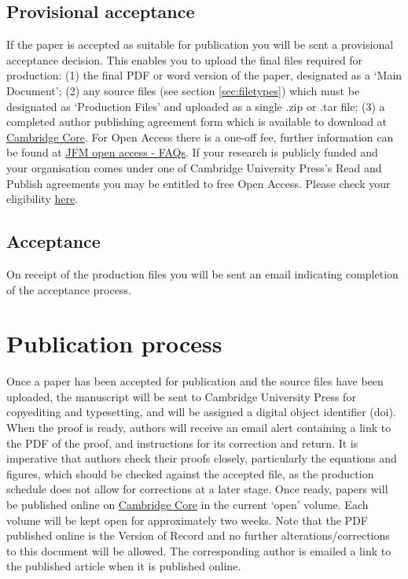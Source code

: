 \documentclass[lineno]{jfm}
\begin{document}
\subsection{Provisional acceptance}
 If the paper is accepted as suitable for publication you will be sent a provisional acceptance decision. This enables you to upload the final files required for production:
(1) the final PDF or word version of the paper, designated as a `Main Document';
(2) any source files (see section \ref{sec:filetypes}) which must be designated as `Production Files' and uploaded as a single .zip or .tar file;
(3) a completed author publishing agreement form which is available to download at \href{https://www.cambridge.org/core/journals/journal-of-fluid-mechanics/information/author-publishing-agreement}{Cambridge Core}. For Open Access there is a one-off fee, further information can be found at \href{https://www.cambridge.org/core/journals/journal-of-fluid-mechanics/information/jfm-open-access-faqs} {JFM open access - FAQs}. If your research is publicly funded and your organisation comes under one of Cambridge University Press's Read and Publish agreements you may be entitled to free Open Access. Please check your eligibility \href{https://www.cambridge.org/core/services/open-access-policies/read-and-publish-agreements}{here}.



\subsection{Acceptance}
 On receipt of the production files you will be sent an email indicating completion of the acceptance process.

\section{Publication process}
 Once a paper has been accepted for publication and the source files have been uploaded, the manuscript will be sent to Cambridge University Press for copyediting and typesetting, and will be assigned a digital object identifier (doi). When the proof is ready, authors will receive an email alert containing a link to the PDF of the proof, and instructions for its correction and return. It is imperative that authors check their proofs closely, particularly the equations and figures, which should be checked against the accepted file, as the production schedule does not allow for corrections at a later stage. Once ready, papers will be published online on \href{https://www.cambridge.org/core/journals/journal-of-fluid-mechanics}{Cambridge Core} in the current `open' volume.  Each volume will be kept open for approximately two weeks. Note that the PDF published online is the Version of Record and no further alterations/corrections to this document will be allowed. The corresponding author is emailed a link to the published article when it is published online.
\end{document}

